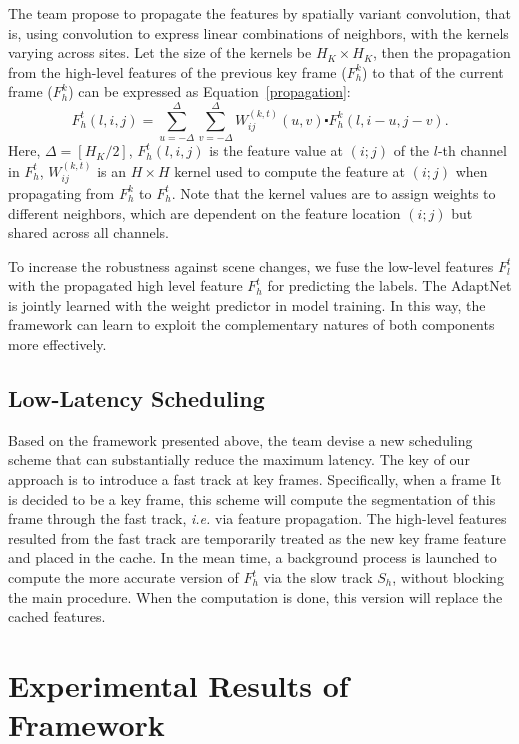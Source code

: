 \documentclass[10pt,twocolumn,letterpaper]{article}
\begin{document}
The team propose to propagate the features by spatially variant convolution, that is, using convolution to express linear combinations of neighbors, with the kernels varying across sites. Let the size of the kernels be $H_K\times H_K$, then the propagation from the high-level features of the previous key frame ($F_h^k$) to that of the current frame ($F_h^k$) can be expressed as Equation~\ref{propagation}:
\begin{equation}
F_h^t(l,i,j)=\sum_{u=-\Delta}^{\Delta}\sum_{v=-\Delta}^{\Delta}W_{ij}^{(k,t)}(u,v)\centerdot F_h^k(l,i-u,j-v).     \label{propagation}
\end{equation}
Here, $\Delta=[H_K/2]$, $F_h^t(l,i,j)$ is the feature value at $(i;j)$ of the $l$-th channel in $F_h^t$, $W_{ij}^{(k,t)}$ is an $H\times H$ kernel used to compute the feature at $(i;j)$ when propagating from $F_h^k$ to $F_h^t$. Note that the kernel values are to assign weights to different neighbors, which are dependent on the feature location $(i;j)$ but shared across all channels.

To increase the robustness against scene changes, we fuse the low-level features $F_l^t$ with the propagated high level feature $F_h^t$ for predicting the labels. The AdaptNet is jointly learned with the weight predictor in model training. In this way, the framework can learn to exploit the complementary natures of both components more effectively.

\subsection{Low-Latency Scheduling}

Based on the framework presented above, the team devise a new scheduling scheme that can substantially reduce the maximum latency. The key of our approach is to introduce a fast track at key frames. Specifically, when a frame It is decided to be a key frame, this scheme will compute the segmentation of this frame through the fast track, \emph{i.e.} via feature propagation. The high-level features resulted from the fast track are temporarily treated as the new key frame feature and placed in the cache. In the mean time, a background process is launched to compute the more accurate version of $F_h^t$ via the slow track $S_h$, without blocking the main procedure. When the computation is done, this version will replace the cached features.

\section{Experimental Results of Framework}
\end{document}

